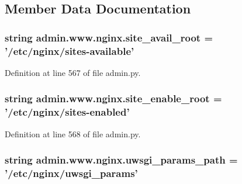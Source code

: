 \subsection{Member Data Documentation}
\hypertarget{classadmin_1_1www_1_1nginx_a0345aad76d9ddd6469c13bef207a9766}{
\subsubsection[{site\-\_\-avail\-\_\-root}]{\setlength{\rightskip}{0pt plus 5cm}string admin.\-www.\-nginx.\-site\-\_\-avail\-\_\-root = '/etc/{\bf nginx}/sites-\/available'\hspace{0.3cm}{\ttfamily [static]}}}\label{classadmin_1_1www_1_1nginx_a0345aad76d9ddd6469c13bef207a9766}


Definition at line 567 of file admin.\-py.

\hypertarget{classadmin_1_1www_1_1nginx_a3e1b0fbd45f31aaeacb6baaec80806ce}{
\subsubsection[{site\-\_\-enable\-\_\-root}]{\setlength{\rightskip}{0pt plus 5cm}string admin.\-www.\-nginx.\-site\-\_\-enable\-\_\-root = '/etc/{\bf nginx}/sites-\/enabled'\hspace{0.3cm}{\ttfamily [static]}}}\label{classadmin_1_1www_1_1nginx_a3e1b0fbd45f31aaeacb6baaec80806ce}


Definition at line 568 of file admin.\-py.

\hypertarget{classadmin_1_1www_1_1nginx_afd444548cd6faf42c56e24e22148a4b4}{
\subsubsection[{uwsgi\-\_\-params\-\_\-path}]{\setlength{\rightskip}{0pt plus 5cm}string admin.\-www.\-nginx.\-uwsgi\-\_\-params\-\_\-path = '/etc/{\bf nginx}/uwsgi\-\_\-params'\hspace{0.3cm}{\ttfamily [static]}}}\label{classadmin_1_1www_1_1nginx_afd444548cd6faf42c56e24e22148a4b4}



